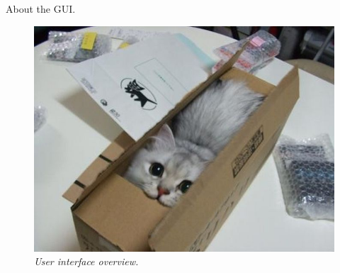 About the GUI.


\begin{figure}[htb]
	\centering
	\includegraphics[width=\linewidth]{images/boxcat.jpg}
	\caption[Overview of the GUI]{\textit{User interface overview.}}
	\label{fig:gui_figure}  %
\end{figure}


